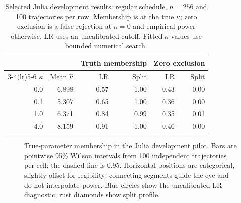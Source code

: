 \documentclass[11pt]{article}
\newcommand{\membershipplot}[1]{%
\addplot+[color=baseline,mark=*,mark size=1.5pt,error bars/.cd,y dir=both,y explicit]
 table[x expr=\thisrow{index}-0.06,y=lr,y error minus=lrminus,y error plus=lrplus]{#1};
\addplot+[color=splitcolor,mark=diamond*,mark size=1.8pt,error bars/.cd,y dir=both,y explicit]
 table[x expr=\thisrow{index}+0.06,y=split,y error minus=splitminus,y error plus=splitplus]{#1};
\addplot[gray,dashed,forget plot] coordinates {(0.65,0.95) (4.35,0.95)};
}
\begin{document}
\begin{table}[!htbp]
\centering\small
\caption{Selected Julia development results: regular schedule, $n=256$ and
100 trajectories per row. Membership is at the true $\kappa$; zero exclusion
is a false rejection at $\kappa=0$ and empirical power otherwise. LR uses an
uncalibrated cutoff. Fitted $\kappa$ values use bounded numerical search.}
\label{tab:results}
\begin{tabular}{rrrrrr}
\toprule
 & & \multicolumn{2}{c}{Truth membership} & \multicolumn{2}{c}{Zero exclusion}\\
\cmidrule(lr){3-4}\cmidrule(lr){5-6}
$\kappa$ & Mean $\widehat\kappa$ & LR & Split & LR & Split\\
\midrule
0.0 & 6.898 & 0.57 & 1.00 & 0.43 & 0.00 \\
0.1 & 5.307 & 0.65 & 1.00 & 0.36 & 0.00 \\
1.0 & 6.371 & 0.84 & 0.99 & 0.35 & 0.01 \\
4.0 & 8.159 & 0.91 & 1.00 & 0.46 & 0.00 \\
\bottomrule
\end{tabular}
\end{table}

\begin{figure}[!ht]
\centering
{}
\caption{True-parameter membership in the Julia development pilot. Bars are
pointwise 95\% Wilson intervals from 100 independent trajectories per cell;
the dashed line is 0.95. Horizontal positions are categorical, slightly offset
for legibility; connecting segments guide the eye and do not interpolate power.
Blue circles show the uncalibrated LR diagnostic; rust diamonds show split profile.}
\label{fig:membership}
\end{figure}
\end{document}

